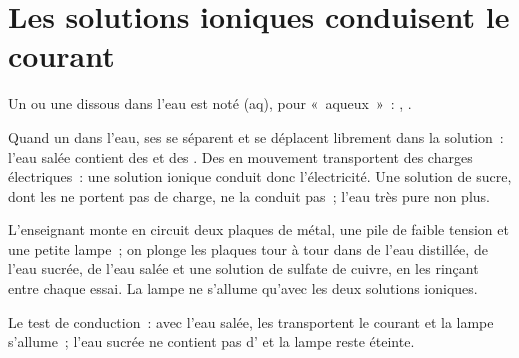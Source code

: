 \section{Les solutions ioniques conduisent le courant}

\begin{notation}\label{not:g9:ions:aq}
Un  ou une  dissous dans l'eau est noté (aq), pour
«~aqueux~»~: , .
\end{notation}

\begin{proposition}\label{prop:g9:ions:conduct}
Quand un   dans l'eau, ses  se séparent et
se déplacent librement dans la solution~: l'eau salée contient des
 et des . Des  en mouvement transportent des
charges électriques~: une solution ionique conduit donc l'électricité.
Une solution de sucre, dont les  ne portent pas de charge, ne
la conduit pas~; l'eau très pure non plus.
\end{proposition}

\begin{inthelab}
L'enseignant monte en circuit deux plaques de métal, une pile de faible
tension et une petite lampe~; on plonge les plaques tour à tour dans de
l'eau distillée, de l'eau sucrée, de l'eau salée et une solution de
sulfate de cuivre, en les rinçant entre chaque essai. La lampe ne
s'allume qu'avec les deux solutions ioniques.
\end{inthelab}

\begin{omfigure}

{\small Le test de conduction~: avec l'eau salée, les  transportent
le courant et la lampe s'allume~; l'eau sucrée ne contient pas d' et
la lampe reste éteinte.}
\end{omfigure}


